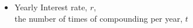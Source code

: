 \documentclass[preview]{standalone}
\begin{document}
\begin{center}
\begin{itemize} \item Yearly Interest rate, $r$, \\ the number of times of compounding per year, $t$ \\ \end{itemize}
\end{center}
\end{document}
